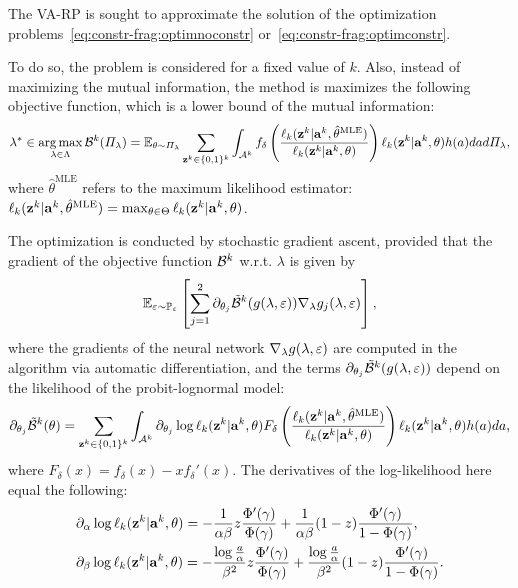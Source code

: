 The VA-RP is sought to approximate the solution of the optimization problems~\eqref{eq:constr-frag:optimnoconstr} or~\eqref{eq:constr-frag:optimconstr}.

To do so, the problem is considered for a fixed value of $k$. 
Also, instead of maximizing the mutual information, the method is maximizes the following objective function, which is a lower bound of the mutual information:
    \begin{equation}
        \lambda^\ast\in\operatorname*{arg\,max}_{\lambda\in\Lambda} \mathcal{B}^k(\varPi_\lambda) = \mathbb{E}_{\theta\sim\varPi_\lambda}\sum_{\mathbf{z}^k\in\{0,1\}^k}\int_{\mathcal{A}^k}f_\delta\left(\frac{\ell_k(\mathbf{z}^k|\mathbf{a}^k,\hat\theta^{\text{MLE}})}{\ell_k(\mathbf{z}^k|\mathbf{a}^k,\theta)}\right) \ell_k(\mathbf{z}^k|\mathbf{a}^k,\theta)h(a)dad\varPi_\lambda,
    \end{equation}
where $\hat\theta^{\text{MLE}}$ refers to the maximum likelihood estimator: $\ell_k(\mathbf{z}^k|\mathbf{a}^k,\hat\theta^{\text{MLE}}) = \max_{\theta\in\Theta}\ell_k(\mathbf{z}^k|\mathbf{a}^k,\theta) $.


The optimization is conducted by stochastic gradient ascent, provided that the gradient of the objective function $\mathcal{B}^k$ w.r.t. $\lambda$ is given by
    \begin{equation}
        \mathbb{E}_{\varepsilon\sim\mathbb{P}_\varepsilon}\left[\sum_{j=1}^{2}\partial_{\theta_j}\tilde{\mathcal{B}}^k(g(\lambda,\varepsilon))\nabla_\lambda g_j(\lambda,\varepsilon)
        \right],
    \end{equation}
where the gradients of the neural network $\nabla_\lambda g(\lambda,\varepsilon)$ are computed in the algorithm via automatic differentiation, and the terms $\partial_{\theta_j}\tilde{\mathcal{B}}^k(g(\lambda,\varepsilon))$  depend on the likelihood of %
the probit-lognormal model:
    \begin{equation}
        \partial_{\theta_j}\tilde{\mathcal{B}}^k(\theta) = \sum_{\mathbf{z}^k\in\{0,1\}^k}\int_{\mathcal{A}^k} \partial_{\theta_j}\log\ell_k(\mathbf{z}^k|\mathbf{a}^k,\theta) F_\delta\left(\frac{\ell_k(\mathbf{z}^k|\mathbf{a}^k,\hat\theta^{\text{MLE}})}{\ell_k(\mathbf{z}^k|\mathbf{a}^k,\theta)}\right)\ell_k(\mathbf{z}^k|\mathbf{a}^k,\theta)h(a)da,
    \end{equation}
where $F_\delta(x) = f_\delta(x)-xf_\delta'(x)$.
The derivatives of the log-likelihood here equal the following:
    \begin{equation}
        \begin{aligned}
            &\partial_\alpha\log\ell_k(\mathbf{z}^k|\mathbf{a}^k,\theta) =  -\frac{1}{\alpha\beta}z\frac{\Phi'(\gamma)}{\Phi(\gamma)} + \frac{1}{\alpha\beta}(1-z)\frac{\Phi'(\gamma)}{1-\Phi(\gamma)} , \\
            &\partial_\beta\log\ell_k(\mathbf{z}^k|\mathbf{a}^k,\theta) = -\frac{\log\frac{a}{\alpha}}{\beta^2}z\frac{\Phi'(\gamma)}{\Phi(\gamma)}+ \frac{\log\frac{a}{\alpha}}{\beta^2}(1-z)\frac{\Phi'(\gamma)}{1-\Phi(\gamma)} .
        \end{aligned}
    \end{equation}



